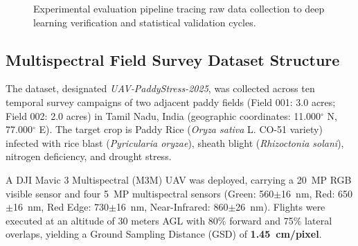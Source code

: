 \documentclass[review,3p,times,authoryear]{elsarticle}
\begin{document}
\begin{figure}[H]
\centering
{}
\caption{Experimental evaluation pipeline tracing raw data collection to deep learning verification and statistical validation cycles.}
\label{fig:eval_pipeline}
\end{figure}

\subsection{Multispectral Field Survey Dataset Structure}
The dataset, designated \textit{UAV-PaddyStress-2025}, was collected across ten temporal survey campaigns of two adjacent paddy fields (Field 001: 3.0 acres; Field 002: 2.0 acres) in Tamil Nadu, India (geographic coordinates: 11.000$^\circ$ N, 77.000$^\circ$ E). The target crop is Paddy Rice (\textit{Oryza sativa} L. CO-51 variety) infected with rice blast (\textit{Pyricularia oryzae}), sheath blight (\textit{Rhizoctonia solani}), nitrogen deficiency, and drought stress. 

A DJI Mavic 3 Multispectral (M3M) UAV was deployed, carrying a 20~MP RGB visible sensor and four 5~MP multispectral sensors (Green: 560$\pm$16~nm, Red: 650$\pm$16~nm, Red Edge: 730$\pm$16~nm, Near-Infrared: 860$\pm$26~nm). Flights were executed at an altitude of 30 meters AGL with 80\% forward and 75\% lateral overlaps, yielding a Ground Sampling Distance (GSD) of \textbf{1.45~cm/pixel}. 
\end{document}
